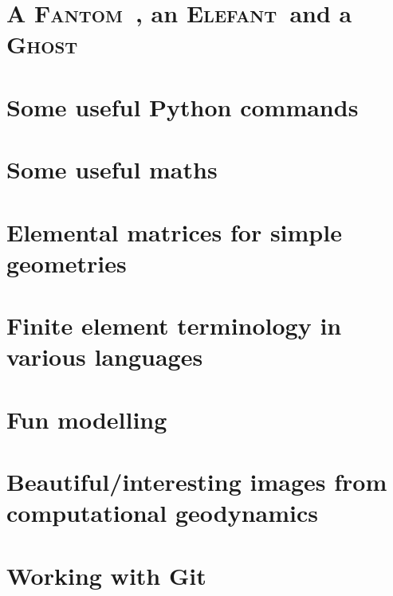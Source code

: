 \documentclass[a4paper]{article}
\newcommand{\elefant}{{\textsc{Elefant~}{}}}
\newcommand{\fantom}{{\textsc{Fantom~}{}}}
\newcommand{\ghost}{{\textsc{Ghost~}{}}}
\numberwithin{equation}{section}
\begin{document}
\section{A \fantom, an \elefant and a \ghost}  %
\newpage %
\section{Some useful Python commands}  %
\newpage %
\section{Some useful maths}  \label{app_maths} %
\newpage %
\section{Elemental matrices for simple geometries}\label{app:mm} 
\newpage %
\section{Finite element terminology in various languages}  %
\newpage %
\section{Fun modelling}  %
\newpage %
\section{Beautiful/interesting images from computational geodynamics}%
\newpage %
\section{Working with Git} %
\newpage %
\end{document}
